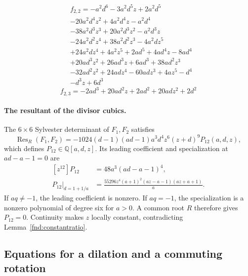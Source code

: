 \documentclass[11pt,a4paper]{article}
\numberwithin{equation}{section}
\theoremstyle{plain}
\theoremstyle{definition}
\theoremstyle{remark}
\begin{document}
\begin{equation}\begin{aligned}&f_{2,2}=- a^{2} d^{6} - 3 a^{2} d^{5} z + 2 a^{2} d^{5} \\&- 20 a^{2} d^{4} z^{2} + 4 a^{2} d^{4} z - a^{2} d^{4} \\&- 38 a^{2} d^{3} z^{3} + 20 a^{2} d^{3} z^{2} - a^{2} d^{3} z \\&- 24 a^{2} d^{2} z^{4} + 38 a^{2} d^{2} z^{3} - 4 a^{2} d z^{5} \\&+ 24 a^{2} d z^{4} + 4 a^{2} z^{5} + 2 a d^{5} + 4 a d^{4} z - 8 a d^{4} \\&+ 20 a d^{3} z^{2} + 26 a d^{3} z + 6 a d^{3} + 38 a d^{2} z^{3} \\&- 32 a d^{2} z^{2} + 24 a d z^{4} - 60 a d z^{3} + 4 a z^{5} - d^{4} \\&- d^{3} z + 6 d^{3}\end{aligned}\end{equation}
\begin{equation}f_{2,3}=- 2 a d^{3} + 20 a d^{2} z + 2 a d^{2} + 20 a d z^{2} + 2 d^{2}\end{equation}

\paragraph{The resultant of the divisor cubics.}
The $6\times6$ Sylvester determinant of $F_1,F_2$ satisfies
\begin{equation}\label{fnd:muresultant}
\operatorname{Res}_R(F_1,F_2)=-1024(d-1)(ad-1)a^3d^4z^6(z+d)^9P_{12}(a,d,z),
\end{equation}
which defines $P_{12}\in\mathbb Q[a,d,z]$. Its leading coefficient and
specialization at $ad-a-1=0$ are
\begin{equation}\label{fnd:muexception}
\begin{aligned}
[z^{12}]P_{12}&=48a^3(ad-a-1)^4,\\
P_{12}\big|_{d=1+1/a}&=\frac{55296z^4(a+1)^2(az-a-1)(az+a+1)}a.
\end{aligned}
\end{equation}
If $aq\ne-1$, the leading coefficient is nonzero. If $aq=-1$, the
specialization is a nonzero polynomial of degree six for $a>0$. A
common root $R$ therefore gives $P_{12}=0$. Continuity makes $z$
locally constant, contradicting Lemma~\ref{fnd:constantratio}.

\subsection{Equations for a dilation and a commuting rotation}\label{appn:commuting-equations}
\end{document}
